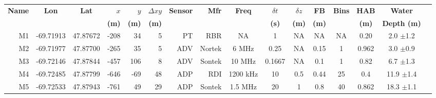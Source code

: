 \documentclass[letterpaper,10pt,landscape]{article}
\begin{document}
\thispagestyle{empty}



\begin{table}
  \label{t:mooring_table}
  \centering
  \begin{tabular}{|r|c|c|r|r|r|r|r|c|c|c|c|c|c|c|c|} \hline
    {\bf Name}          & {\bf Lon}                  & {\bf Lat}                 & $x$                    & $y$                  & $\Delta xy$         & {\bf Sensor} &{\bf Mfr}   & {\bf Freq}&$\delta t$ &$\delta z$& {\bf FB}   & {\bf Bins} & {\bf HAB}  & {\bf Water}                        \\
    ~                   &                            &                           & {\bf (m)}              & {\bf (m)}            & {\bf (m)}           &              &            &           & {\bf (s)} & {\bf (m)}& {\bf (m)}  &            & {\bf (m)}  & {\bf Depth (m)}                    \\\hline \hline
    M1                  & -69.71913                  & 47.87672                  & -208                   & 34                   & 5                   & PT           & RBR        & NA        & 1         & NA       & NA         & NA         & 0.20       &  2.0 $\pm$1.2                      \\\hline
    M2                  & -69.71977                  & 47.87700                  & -265                   & 35                   & 5                   & ADV          & Nortek     & 6 MHz     & 0.25      & NA       & 0.15       & 1          & 0.962      &  3.0 $\pm$0.9                      \\\hline %
    M3                  & -69.72146                  & 47.87844                  & -457                   & 106                  & 8                   & ADV          & Sontek     & 10 MHz    & 0.1667    & NA       & 0.1        & 1          & 0.82       &  6.7 $\pm$1.3                      \\\hline
    M4                  & -69.72485                  & 47.87799                  & -646                   & -69                  & 48                  & ADP          & RDI        & 1200 kHz  & 10        & 0.5      & 0.44       & 25         & 0.4        &  11.9 $\pm$1.4                     \\\hline
    \multirow{4}{*}{M5} & \multirow{4}{*}{-69.72533} & \multirow{4}{*}{47.87943} & \multirow{4}{*}{-761}  & \multirow{4}{*}{49}  & \multirow{4}{*}{29} & ADP          & Sontek     & 1.5 MHz   & 20        & 1        & 0.8        & 40         & 0.862      &  \multirow{4}{*}{18.3 $\pm$1.1}    \\ 

\end{tabular}
\end{table}
\end{document}
